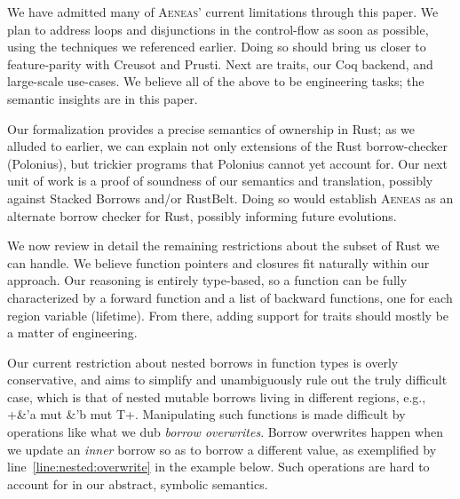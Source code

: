 \documentclass[acmsmall,screen]{acmart}
\newif\iflong
\newif\ifshort
\newcommand{\aeneas}{\textsc{Aeneas}\xspace}
\newcommand\myparagraph[1]{\emph{#1}.\ }
\let\myparagraph\paragraph
\begin{document}
\fi

\ifshort
\section{Future work; related work; conclusion}
\label{sec:future}
\label{sec:conclusion}
\myparagraph{Future work}
\fi
\iflong
\section{Future work}
\label{sec:future}
\fi
We have admitted many of \aeneas' current limitations through this paper. We
plan to address loops and disjunctions in the control-flow as soon as possible,
using the techniques we referenced earlier. Doing so should bring
us closer to feature-parity with Creusot and Prusti. Next are traits,
our Coq backend, and large-scale use-cases. We believe all of the above to be
engineering tasks; the semantic insights are in this paper.

Our formalization provides a precise semantics of ownership in Rust; as we
alluded to earlier, we can explain not only extensions of the Rust
borrow-checker (Polonius), but trickier programs that Polonius
cannot yet account for.
Our next unit of work is a proof of soundness of our semantics and translation, possibly
against Stacked Borrows and/or RustBelt. Doing so would establish \aeneas as
an alternate borrow checker for Rust, possibly informing future evolutions.
\iflong

We now review in detail the remaining restrictions about the subset of Rust we
can handle.
We believe function pointers and closures fit naturally within our approach. Our reasoning is
entirely type-based, so a function can be fully characterized by a forward function
and a list of backward functions, one for each region variable (lifetime).
From there, adding support for traits should mostly be a matter of engineering.


Our current restriction about nested borrows in function types is overly conservative, and aims
to simplify and unambiguously rule out the truly difficult case, which is that of
nested mutable borrows living in different regions, e.g., \li+&'a mut &'b mut T+.
Manipulating such functions is made difficult by
operations like what we dub \emph{borrow overwrites}.
Borrow overwrites happen when we update an \emph{inner} borrow so as to borrow
a different value, as exemplified by line~\ref{line:nested:overwrite} in the example below.
Such operations are hard to account for in our abstract, symbolic semantics.
\end{document}
